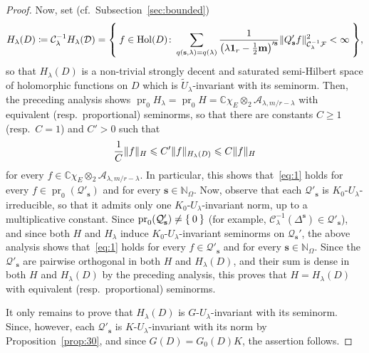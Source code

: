 \documentclass[10.5pt,reqno]{amsart}
\DeclareMathOperator{\pr}{pr}
\newcommand{\Hol}{\mathrm{Hol}}
\newcommand{\vect}[1]{\mathbf{{#1}}}
\DeclarePairedDelimiter{\norm}{\lVert}{\rVert}
\let\originalleft\left
\let\originalright\right
\renewcommand{\left}{\mathopen{}\mathclose\bgroup\originalleft}
\renewcommand{\right}{\aftergroup\egroup\originalright}
\newcommand{\N}{\mathds{N}}
\newcommand{\C}{\mathds{C}}
\newcommand{\Ac}{\mathcal{A}}
\newcommand{\Cc}{\mathcal{C}}
\newcommand{\Dc}{\mathcal{D}}
\newcommand{\Fc}{\mathcal{F}}
\newcommand{\Qc}{\mathcal{Q}}
\newcommand{\meg}{\leqslant}
\newcommand{\Meg}{\geqslant}
\begin{document}
\begin{proof}
	Now, set (cf.~Subsection~\ref{sec:bounded})
	\[
	H_\lambda(D)\coloneqq \Cc_\lambda^{-1}H_\lambda(\Dc)=\Set{f\in \Hol(D)\colon \sum_{q(\vect s,\lambda)=q(\lambda)} \frac{1}{\left(\lambda \vect 1_r-\frac 1 2 \vect m\right)'^{\vect s}} \norm{Q'_{\vect s}f}_{\Cc_\lambda^{-1}\Fc}^2<\infty},
	\]
	so that $H_\lambda(D)$ is   a non-trivial strongly decent and saturated semi-Hilbert space  of holomorphic functions on $D$ which is   $\widetilde U_\lambda$-invariant with its seminorm. Then, the preceding analysis shows $\pr_0 H_\lambda=\pr_0 H=\C\chi_E\otimes_2\Ac_{\lambda,m/r-\lambda}$ with equivalent (resp.\ proportional) seminorms, so that there are constants $C\Meg 1$ (resp.\ $C=1$) and $C'>0$ such that
	\begin{equation}\label{eq:1}
	\frac 1 C\norm{f}_{H}\meg C'\norm{f}_{H_\lambda(D)}\meg C \norm{f}_H
	\end{equation}
	for every $f\in \C\chi_E\otimes_2\Ac_{\lambda,m/r-\lambda}$. In particular, this shows that~\eqref{eq:1} holds	for every $f\in \pr_0(\Qc'_{\vect s})$ and for every $\vect s\in\N_\Omega$. Now, observe that each $\Qc'_{\vect s}$ is $K_0$-$U_\lambda$-irreducible, so that it admits only one $K_0$-$U_\lambda$-invariant norm, up to a multiplicative constant. Since $ \pr_0(\Qc'_{\vect s})\neq \Set{0}$ (for example, $\Cc_\lambda^{-1}(\Delta^{\vect s})\in \Qc'_{\vect s}$), and since both $H$ and $H_\lambda$ induce $K_0$-$U_\lambda$-invariant seminorms on $\Qc_{\vect s}'$, the above analysis shows that~\eqref{eq:1} holds	for every $f\in  \Qc'_{\vect s}$ and for every $\vect s\in\N_\Omega$. Since the $\Qc'_{\vect s}$ are pairwise orthogonal in both $H$ and $H_\lambda(D)$, and their sum is dense in both $H$ and $H_\lambda(D)$ by the preceding analysis, this proves that $H=H_\lambda(D)$ with equivalent (resp.\ proportional) seminorms.  
	
	It only remains to prove that $H_\lambda(D)$ is $G$-$U_\lambda$-invariant with its seminorm. Since, however, each $\Qc'_{\vect s}$ is $K$-$U_\lambda$-invariant with its norm by Proposition~\ref{prop:30}, and since $G(D)=G_0(D) K$, the assertion follows.
\end{proof}
\end{document}
